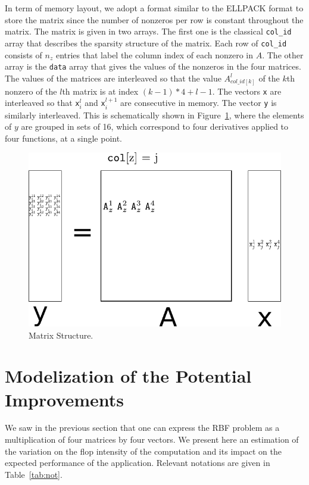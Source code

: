 \documentclass[10pt,conference,compsocconf]{IEEEtran}
\begin{document}
In term of memory layout, we adopt a format similar to the ELLPACK
format to store the matrix since the number of nonzeros per row is
constant throughout the matrix. The matrix is given in two arrays. The
first one is the classical {\tt col\_id} array that describes the
sparsity structure of the matrix. Each row of {\tt col\_id} consists of $n_z$
entries that label the column index of each nonzero in $A$. The
other array is the {\tt data} array that gives the values of the 
nonzeros in the four matrices. The values of the matrices are interleaved
so that the value $A^l_{col\_id[k]}$ of the $k$th nonzero of the
$l$th matrix is at index $(k-1)*4+l-1$. The vectors {\tt x} are 
interleaved so that {\tt x}$^l_i$ and {\tt x}$^{l+1}_i$ are
consecutive in memory. The vector {\tt y} is similarly
interleaved. This is schematically shown in Figure~\ref{fig:mat_struct}, 
where the elements of $y$ are grouped in sets of 16, which correspond
to four derivatives applied to four functions, at a single point. 

\begin{figure}
  \centering
  \includegraphics[width=\linewidth]{figures/matrix_not.pdf}
  \caption{Matrix Structure.}
  \label{fig:mat_struct}
\end{figure}


\section{Modelization of the Potential Improvements}
\label{sec:model}

We saw in the previous section that one can express the RBF problem as
a multiplication of four matrices by four vectors. We present here an
estimation of the variation on the flop intensity of the computation
and its impact on the expected performance of the
application. Relevant notations are given in Table~\ref{tab:not}.
\end{document}
